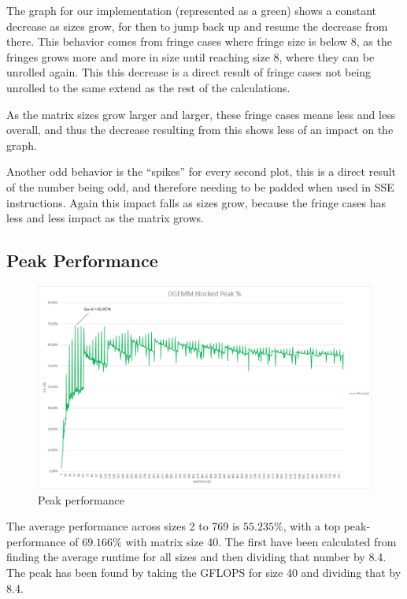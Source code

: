 \documentclass[a4paper.11pt,oneside]{book}
\begin{document}
The graph for our implementation (represented as a green) shows a constant
decrease as sizes grow, for then to jump back up and resume the decrease from
there. This behavior comes from fringe cases where fringe size is below 8, as
the fringes grows more and more in size until reaching size 8, where they can be
unrolled again. This this decrease is a direct result of fringe cases not being
unrolled to the same extend as the rest of the calculations.

As the matrix sizes grow larger and larger, these fringe cases means less and
less overall, and thus the decrease resulting from this shows less of an impact
on the graph.

Another odd behavior is the ``spikes'' for every second plot, this is a direct
result of the number being odd, and therefore needing to be padded when used in
SSE instructions. Again this impact falls as sizes grow, because the fringe
cases has less and less impact as the matrix grows.

\subsection{Peak Performance}

\begin{figure}[H]
  \centering
  \includegraphics[width=0.9\linewidth]{peak-graph.png}
  \caption{Peak performance}
  \centering
  \label{fig:sub1}
\end{figure}

The average performance across sizes 2 to 769 is $55.235\%$, with a top peak-
performance of $69.166\%$ with matrix size 40. The first have been calculated
from finding the average runtime for all sizes and then dividing that number by
8.4. The peak has been found by taking the GFLOPS for size 40 and dividing that
by 8.4.
\end{document}
